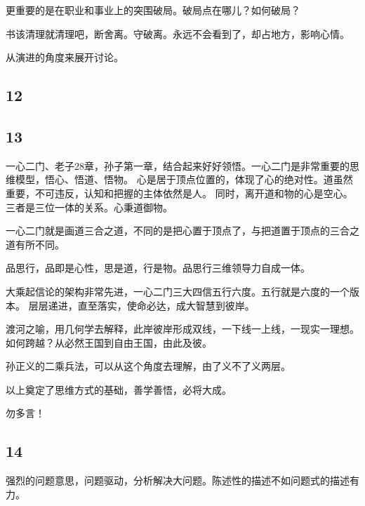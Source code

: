 更重要的是在职业和事业上的突围破局。破局点在哪儿？如何破局？

书该清理就清理吧，断舍离。守破离。永远不会看到了，却占地方，影响心情。

\hrulefill

从演进的角度来展开讨论。

\subsection{12}

\subsection{13}

一心二门、老子28章，孙子第一章，结合起来好好领悟。一心二门是非常重要的思维模型，悟心、悟道、悟物。
心是居于顶点位置的，体现了心的绝对性。道虽然重要，不可违反，认知和把握的主体依然是人。
同时，离开道和物的心是空心。三者是三位一体的关系。心秉道御物。

一心二门就是画道三合之道，不同的是把心置于顶点了，与把道置于顶点的三合之道有所不同。

品思行，品即是心性，思是道，行是物。品思行三维领导力自成一体。

大乘起信论的架构非常先进，一心二门三大四信五行六度。五行就是六度的一个版本。
层层递进，直至落实，使命必达，成大智慧到彼岸。

渡河之喻，用几何学去解释，此岸彼岸形成双线，一下线一上线，一现实一理想。
如何跨越？从必然王国到自由王国，由此及彼。

孙正义的二乘兵法，可以从这个角度去理解，由了义不了义两层。

以上奠定了思维方式的基础，善学善悟，必将大成。

\hrulefill

勿多言！

\subsection{14}

强烈的问题意思，问题驱动，分析解决大问题。陈述性的描述不如问题式的描述有力。
